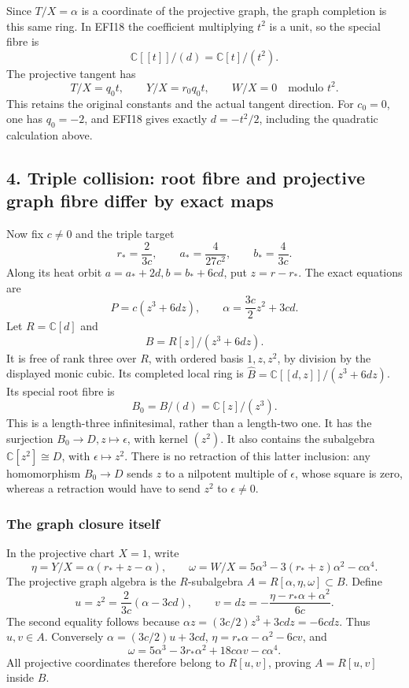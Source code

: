 \documentclass[
  10pt,
  a4paper,
]{article}
\begin{document}
Since \(T/X=\alpha\) is a coordinate of the projective graph, the graph
completion is this same ring. In EFI18 the coefficient multiplying
\(t^2\) is a unit, so the special fibre is \[
\mathbb C[[t]]/(d)=\mathbb C[t]/(t^2).
\tag{EFI19}
\] The projective tangent has \[
T/X=q_0t,\qquad Y/X=r_0q_0t,\qquad W/X=0
\quad\text{modulo }t^2.
\tag{EFI20}
\] This retains the original constants and the actual tangent direction.
For \(c_0=0\), one has \(q_0=-2\), and EFI18 gives exactly \(d=-t^2/2\),
including the quadratic calculation above.

\subsection{4. Triple collision: root fibre and projective graph fibre
differ by exact
maps}\label{triple-collision-root-fibre-and-projective-graph-fibre-differ-by-exact-maps}

Now fix \(c\ne0\) and the triple target \[
r_* =\frac{2}{3c},\qquad
a_* =\frac{4}{27c^2},\qquad b_* =\frac4{3c}.
\tag{EFI21}
\] Along its heat orbit \(a=a_*+2d, b=b_*+6cd\), put \(z=r-r_*\). The
exact equations are \[
P=c(z^3+6dz),\qquad
\alpha=\frac{3c}{2}z^2+3cd.
\tag{EFI22}
\] Let \(R=\mathbb C[d]\) and \[
B=R[z]/(z^3+6dz).
\tag{EFI23}
\] It is free of rank three over \(R\), with ordered basis \(1,z,z^2\),
by division by the displayed monic cubic. Its completed local ring is
\(\widehat B=\mathbb C[[d,z]]/(z^3+6dz)\). Its special root fibre is \[
B_0=B/(d)=\mathbb C[z]/(z^3).
\tag{EFI24}
\] This is a length-three infinitesimal, rather than a length-two one.
It has the surjection \(B_0\to D, z\mapsto\epsilon\), with kernel
\((z^2)\). It also contains the subalgebra \(\mathbb C[z^2]\cong D\),
with \(\epsilon\mapsto z^2\). There is no retraction of this latter
inclusion: any homomorphism \(B_0\to D\) sends \(z\) to a nilpotent
multiple of \(\epsilon\), whose square is zero, whereas a retraction
would have to send \(z^2\) to \(\epsilon\ne0\).

\subsubsection{The graph closure itself}\label{the-graph-closure-itself}

In the projective chart \(X=1\), write \[
\eta=Y/X=\alpha(r_*+z-\alpha),\qquad
\omega=W/X=5\alpha^3-3(r_*+z)\alpha^2-c\alpha^4.
\tag{EFI25}
\] The projective graph algebra is the \(R\)-subalgebra
\(A=R[\alpha,\eta,\omega]\subset B\). Define \[
u=z^2=\frac{2}{3c}(\alpha-3cd),
\qquad
v=dz=-\frac{\eta-r_*\alpha+\alpha^2}{6c}.
\tag{EFI26}
\] The second equality follows because
\(\alpha z=(3c/2)z^3+3cdz=-6cdz\). Thus \(u,v\in A\). Conversely
\(\alpha=(3c/2)u+3cd\), \(\eta=r_*\alpha-\alpha^2-6cv\), and \[
\omega=5\alpha^3-3r_*\alpha^2+18c\alpha v-c\alpha^4.
\tag{EFI27}
\] All projective coordinates therefore belong to \(R[u,v]\), proving
\(A=R[u,v]\) inside \(B\).
\end{document}

